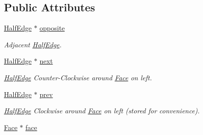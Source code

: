 \subsection*{Public Attributes}
\begin{DoxyCompactItemize}
\item 
\hypertarget{structvoom_1_1_half_edge_ab6857e9405644650d95e124c668daf5e}{
\hyperlink{structvoom_1_1_half_edge}{HalfEdge} $\ast$ \hyperlink{structvoom_1_1_half_edge_ab6857e9405644650d95e124c668daf5e}{opposite}}
\label{structvoom_1_1_half_edge_ab6857e9405644650d95e124c668daf5e}

\begin{DoxyCompactList}\small\item\em Adjacent \hyperlink{structvoom_1_1_half_edge}{HalfEdge}. \item\end{DoxyCompactList}\item 
\hypertarget{structvoom_1_1_half_edge_ae88154581a184a0076c3092673384d56}{
\hyperlink{structvoom_1_1_half_edge}{HalfEdge} $\ast$ \hyperlink{structvoom_1_1_half_edge_ae88154581a184a0076c3092673384d56}{next}}
\label{structvoom_1_1_half_edge_ae88154581a184a0076c3092673384d56}

\begin{DoxyCompactList}\small\item\em \hyperlink{structvoom_1_1_half_edge}{HalfEdge} Counter-\/Clockwise around \hyperlink{structvoom_1_1_face}{Face} on left. \item\end{DoxyCompactList}\item 
\hypertarget{structvoom_1_1_half_edge_ae860b84d6a143f0517e49469a56d5425}{
\hyperlink{structvoom_1_1_half_edge}{HalfEdge} $\ast$ \hyperlink{structvoom_1_1_half_edge_ae860b84d6a143f0517e49469a56d5425}{prev}}
\label{structvoom_1_1_half_edge_ae860b84d6a143f0517e49469a56d5425}

\begin{DoxyCompactList}\small\item\em \hyperlink{structvoom_1_1_half_edge}{HalfEdge} Clockwise around \hyperlink{structvoom_1_1_face}{Face} on left (stored for convenience). \item\end{DoxyCompactList}\item 
\hypertarget{structvoom_1_1_half_edge_a16895820b27ac269c5f27288c4752849}{
\hyperlink{structvoom_1_1_face}{Face} $\ast$ \hyperlink{structvoom_1_1_half_edge_a16895820b27ac269c5f27288c4752849}{face}}
\label{structvoom_1_1_half_edge_a16895820b27ac269c5f27288c4752849}


\end{DoxyCompactItemize}
